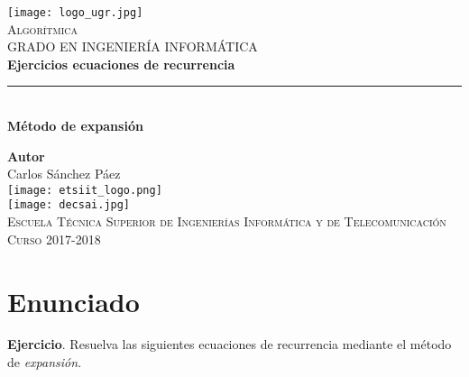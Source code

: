 \documentclass[12pt,spanish]{article}
\begin{document}
\begin{titlepage}

\newlength{\centeroffset}
\setlength{\centeroffset}{-0.5\oddsidemargin}
\addtolength{\centeroffset}{0.5\evensidemargin}
\thispagestyle{empty}

\noindent\hspace*{\centeroffset}
\begin{minipage}{\textwidth}

\centering
\texttt{[image: logo\_ugr.jpg]}\\[1.4cm]

\textsc{ \Large Algorítmica\\[0.2cm]}
\textsc{GRADO EN INGENIERÍA INFORMÁTICA}\\[1cm]

{\Huge\bfseries Ejercicios ecuaciones de recurrencia\\}
\noindent\rule[-1ex]{\textwidth}{3pt}\\[3.5ex]
{\large\bfseries Método de expansión}
\end{minipage}

\vspace{1.5cm}
\noindent\hspace*{\centeroffset}
\begin{minipage}{\textwidth}
\centering

\textbf{Autor}\\ {Carlos Sánchez Páez}\\[2.5ex]
\texttt{[image: etsiit\_logo.png]}\\[0.1cm]
\vspace{1.5cm}
\texttt{[image: decsai.jpg]}\\[0.1cm]
\vspace{1cm}
\textsc{Escuela Técnica Superior de Ingenierías Informática y de Telecomunicación}\\
\vspace{1cm}
\textsc{Curso 2017-2018}
\end{minipage}
\end{titlepage}
\tableofcontents
\listoffigures
\thispagestyle{empty}
\newpage
\setcounter{page}{1}

\section{Enunciado}

\textbf{Ejercicio}. Resuelva las siguientes ecuaciones de recurrencia mediante el método de \textit{expansión}.
\end{document}
